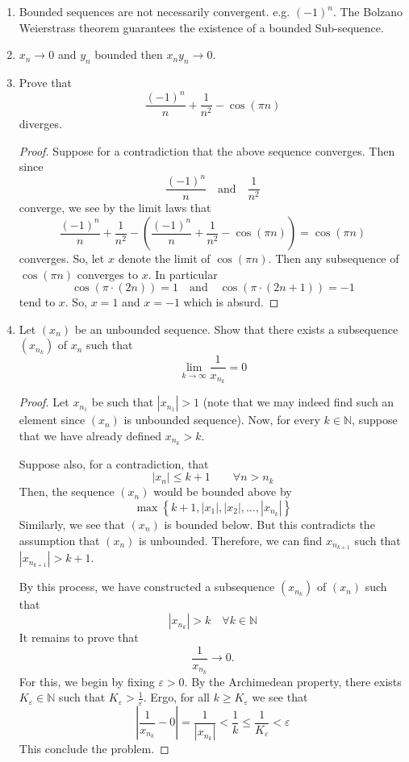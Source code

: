 \documentclass[12pt, reqno]{article}
\numberwithin{equation}{section}
\theoremstyle{definition}
\theoremstyle{remark}
\newcommand{\NN}{\mathbb{N}}
\newcommand{\set}[1]{\left\{#1\right\}}
\newcommand{\abs}[1]{\left\lvert#1\right\rvert}
\renewcommand{\epsilon}{\varepsilon}
\begin{document}
\begin{enumerate}[leftmargin=*]
	\item Bounded sequences are not necessarily convergent. e.g. $(-1)^n$. The Bolzano Weierstrass theorem guarantees the existence of a bounded Sub-sequence.

	\item $x_n \to 0$ and $y_n$ bounded then $x_ny_n \to 0$.

	\item Prove that
	      \[
		      \frac{(-1)^n}{n} + \frac{1}{n^2} - \cos\left(\pi n\right)
	      \]
	      diverges.
	      \begin{proof}
		      Suppose for a contradiction that the above sequence converges. Then since
		      \[
			      \frac{(-1)^n}{n} \quad\text{and}\quad\frac{1}{n^2}
		      \]
		      converge, we see by the limit laws that
		      \[
			      \frac{(-1)^n}{n} + \frac{1}{n^2} - \left(\frac{(-1)^n}{n} + \frac{1}{n^2} - \cos\left(\pi n\right)\right) = \cos(\pi n)
		      \]
		      converges. So, let $x$ denote the limit of $\cos(\pi n)$. Then any subsequence of $\cos(\pi n)$ converges to $x$. In particular
		      \[
			      \cos(\pi \cdot (2n)) = 1
			      \quad\text{and}\quad
			      \cos(\pi \cdot (2n+1)) = -1
		      \]
		      tend to $x$. So, $x=1$ and $x=-1$ which is absurd.
	      \end{proof}
	\item Let $(x_n)$ be an unbounded sequence. Show that there exists a subsequence $(x_{n_k})$ of $x_n$ such that
	      \[
		      \lim_{k\to\infty} \frac{1}{x_{n_k}} = 0
	      \]
	      \begin{proof}
		      Let $x_{n_1}$ be such that $\abs{x_{n_1}} > 1$ (note that we may indeed find such an element since $(x_n)$ is unbounded sequence). Now, for every $k\in \NN$, suppose that we have already defined $x_{n_k} > k$.

		      Suppose also, for a contradiction, that
		      \[
			      \abs{x_n} \leq k+1 \qquad\forall n > n_k
		      \]
		      Then, the sequence $(x_n)$ would be bounded above by
		      \[
			      \max\set{k+1, \abs{x_1}, \abs{x_2}, \dots, \abs{x_{n_k}}}
		      \]
		      Similarly, we see that $(x_n)$ is bounded below. But this contradicts the assumption that $(x_n)$ is unbounded. Therefore, we can find $x_{n_{k+1}}$ such that $\abs{x_{n_{k+1}}} > k+1$.

		      By this process, we have constructed a subsequence $(x_{n_k})$ of $(x_n)$ such that
		      \[
			      \abs{x_{n_k}} > k \quad\forall k\in\NN
		      \]
		      It remains to prove that
		      \[
			      \frac{1}{x_{n_k}} \to 0.
		      \]
		      For this, we begin by fixing $\epsilon > 0$. By the Archimedean property, there exists $K_\epsilon\in\NN$ such that $K_\epsilon > \frac{1}{\epsilon}$. Ergo, for all $k\geq K_\epsilon$ we see that
		      \[
			      \abs{\frac{1}{x_{n_k}} - 0} = \frac{1}{\abs{x_{n_k}}} < \frac{1}{k} \leq \frac{1}{K_\epsilon} < \epsilon
		      \]
		      This conclude the problem.
	      \end{proof}


\end{enumerate}
\end{document}
